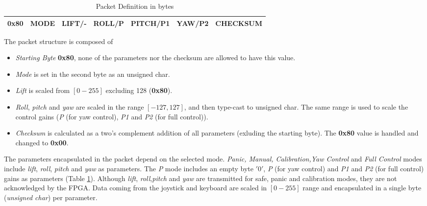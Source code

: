 \documentclass{article}
\begin{document}
\begin{table}[ht]
\centering
\begin{tabular}{|c|c|c|c|c|c|c|}
\hline 
0x80 & MODE & LIFT/- & ROLL/P & PITCH/P1 & YAW/P2 & CHECKSUM \\ 
\hline 
\end{tabular} 
\caption{Packet Definition in bytes}
\label{tbl:PkgDefinition}
\end{table}

The packet structure is composed of
\begin{itemize}

\item{\emph{Starting Byte} \textbf{0x80}, none of the parameters nor the checksum are allowed to have this value.}

\item{\emph{Mode} is set in the second byte as an unsigned char.}

\item{\emph{Lift} is scaled from $[0-255]$ excluding 128 (\textbf{0x80}).}

\item{\emph{Roll}, \emph{pitch} and \emph{yaw} are scaled in the range $[-127,127]$, and then type-cast to unsigned char. The same range is used to scale the control gains (\emph{P} (for yaw control), \emph{P1} and \emph{P2} (for full control)).}

\item{\emph{Checksum} is calculated as a two's complement addition of all parameters (exluding the starting byte). The \textbf{0x80} value is handled and changed to \textbf{0x00}.}

\end{itemize}

The parameters encapsulated in the packet depend on the selected mode. \emph{Panic, Manual, Calibration,Yaw Control} and \emph{Full Control} modes include \emph{lift}, \emph{roll}, \emph{pitch} and \emph{yaw} as parameters. The \emph{P} mode includes an empty byte $'0'$, \emph{P} (for yaw control) and \emph{P1} and \emph{P2} (for full control) gains as parameters (Table \ref{tbl:PkgDefinition}). Although \emph{lift}, \emph{roll},\emph{pitch} and \emph{yaw} are transmitted for safe, panic and calibration modes, they are not acknowledged by the FPGA. Data coming from the joystick and keyboard are scaled in $[0-255]$ range and encapsulated in a single byte (\emph{unsigned char}) per parameter.
\end{document}
